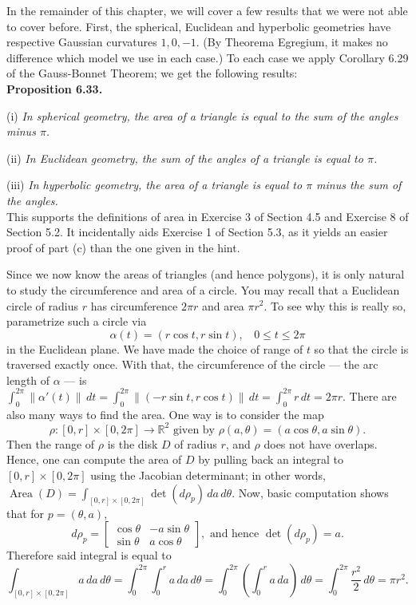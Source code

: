 \documentclass[leqno]{book}
\begin{document}
In the remainder of this chapter, we will cover a few results that we were not able to cover before.  First, the spherical, Euclidean and hyperbolic geometries have respective Gaussian curvatures $1,0,-1$.  (By Theorema Egregium, it makes no difference which model we use in each case.)  To each case we apply Corollary 6.29 of the Gauss-Bonnet Theorem; we get the following results:\\

\noindent\textbf{Proposition 6.33.}

(i) \emph{In spherical geometry, the area of a triangle is equal to the sum of the angles minus $\pi$.}

(ii) \emph{In Euclidean geometry, the sum of the angles of a triangle is equal to $\pi$.}

(iii) \emph{In hyperbolic geometry, the area of a triangle is equal to $\pi$ minus the sum of the angles.}\\

\noindent This supports the definitions of area in Exercise 3 of Section 4.5 and Exercise 8 of Section 5.2.  It incidentally aids Exercise 1 of Section 5.3, as it yields an easier proof of part (c) than the one given in the hint.

Since we now know the areas of triangles (and hence polygons), it is only natural to study the circumference and area of a circle.  You may recall that a Euclidean circle of radius $r$ has circumference $2\pi r$ and area $\pi r^2$.  To see why this is really so, parametrize such a circle via
$$\alpha(t)=(r\cos t,r\sin t),~~~~0\leqslant t\leqslant 2\pi$$
in the Euclidean plane.  We have made the choice of range of $t$ so that the circle is traversed exactly once.  With that, the circumference of the circle \---- the arc length of $\alpha$ \---- is $\int_0^{2\pi}\|\alpha'(t)\|\,dt=\int_0^{2\pi}\|(-r\sin t,r\cos t)\|\,dt=\int_0^{2\pi}r\,dt=2\pi r$.
There are also many ways to find the area.  One way is to consider the map
$$\rho:[0,r]\times[0,2\pi]\to\mathbb R^2\text{ given by }\rho(a,\theta)=(a\cos\theta,a\sin\theta).$$
Then the range of $\rho$ is the disk $D$ of radius $r$, and $\rho$ does not have overlaps.  Hence, one can compute the area of $D$ by pulling back an integral to $[0,r]\times[0,2\pi]$ using the Jacobian determinant; in other words, $\operatorname{Area}(D)=\int_{[0,r]\times[0,2\pi]}\det(d\rho_p)\,da\,d\theta$.  Now, basic computation shows that for $p=(\theta,a)$,
$$d\rho_p=\begin{bmatrix}\cos\theta&-a\sin\theta\\\sin\theta&a\cos\theta\end{bmatrix},\text{ and hence }\det(d\rho_p)=a.$$
Therefore said integral is equal to
$$\int_{[0,r]\times[0,2\pi]}a\,da\,d\theta=\int_0^{2\pi}\int_0^r a\,da\,d\theta=\int_0^{2\pi}\left(\int_0^ra\,da\right)\,d\theta=\int_0^{2\pi}\frac{r^2}2\,d\theta=\pi r^2.$$
\end{document}
